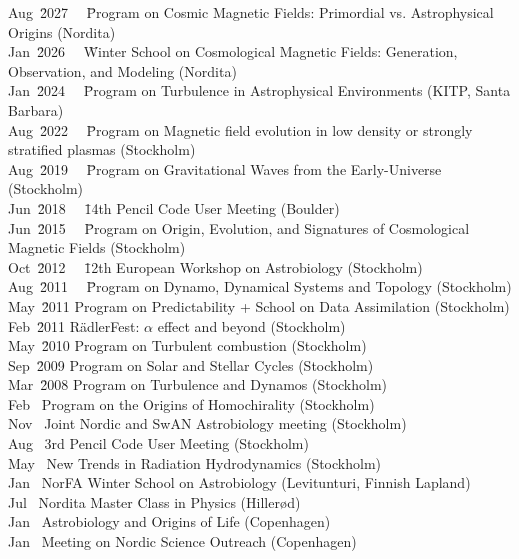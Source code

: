 \documentclass{article}
\begin{document}
\begin{tabbing}
Aug~\= 2027 ~~\= Program on Cosmic Magnetic Fields: Primordial vs. Astrophysical Origins (Nordita)\\
Jan~\= 2026 ~~\= Winter School on Cosmological Magnetic Fields: Generation, Observation, and Modeling (Nordita)\\
Jan~\= 2024 ~~\= Program on Turbulence in Astrophysical Environments (KITP, Santa Barbara) \\
Aug~\= 2022 ~~\= Program on Magnetic field evolution in low density or strongly stratified plasmas (Stockholm) \\
Aug~\= 2019 ~~\= Program on Gravitational Waves from the Early-Universe (Stockholm) \\
Jun~\= 2018 ~~\= 14th Pencil Code User Meeting (Boulder) \\
Jun~\= 2015 ~~\= Program on Origin, Evolution, and Signatures of Cosmological Magnetic Fields (Stockholm)\\
Oct~\= 2012 ~~\= 12th European Workshop on Astrobiology (Stockholm)\\
Aug~\= 2011 ~~\= Program on Dynamo, Dynamical Systems and Topology (Stockholm)\\
May~\= 2011   \> Program on Predictability + School on Data Assimilation (Stockholm) \\
Feb~\= 2011   \> R\"adlerFest: $\alpha$ effect and beyond (Stockholm) \\
May~\= 2010   \> Program on Turbulent combustion (Stockholm) \\
Sep~\= 2009   \> Program on Solar and Stellar Cycles (Stockholm) \\
Mar~\= 2008   \> Program on Turbulence and Dynamos (Stockholm) \\
Feb~   \> Program on the Origins of Homochirality (Stockholm) \\
Nov~   \> Joint Nordic and SwAN Astrobiology meeting (Stockholm) \\
Aug~   \> 3rd Pencil Code User Meeting (Stockholm) \\
May~   \> New Trends in Radiation Hydrodynamics (Stockholm) \\
Jan~   \> NorFA Winter School on Astrobiology (Levitunturi, Finnish Lapland)\\
Jul~   \> Nordita Master Class in Physics (Hiller\o d)\\
Jan~   \> Astrobiology and Origins of Life (Copenhagen)\\
Jan~   \> Meeting on Nordic Science Outreach (Copenhagen)\\

\end{tabbing}
\end{document}
